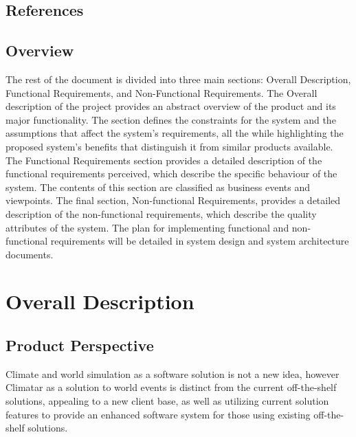 \documentclass[]{article}
\begin{document}
\subsection{References}
\label{sub:references}



\subsection{Overview}
\label{sub:overview}
	The rest of the document is divided into three main sections: Overall Description, Functional Requirements, and Non-Functional Requirements. The Overall description of the project provides an abstract overview of the product and its major functionality. The section defines the constraints for the system and the assumptions that affect the system's requirements, all the while highlighting the proposed system's benefits that distinguish it from similar products available. The Functional Requirements section provides a detailed description of the functional requirements perceived, which describe the specific behaviour of the system. The contents of this section are classified as business events and viewpoints. The final section, Non-functional Requirements, provides a detailed description of the non-functional requirements, which describe the quality attributes of the system. The plan for implementing functional and non-functional requirements will be detailed in system design and system architecture documents.


\section{Overall Description}
\label{sec:overall_description}
\subsection{Product Perspective}
\label{sub:product_perspective}

Climate and world simulation as a software solution is not a new idea, however Climatar as a solution to world events is distinct from the current off-the-shelf solutions, appealing to a new client base, as well as utilizing current solution features to provide an enhanced software system for those using existing off-the-shelf solutions.
\end{document}
